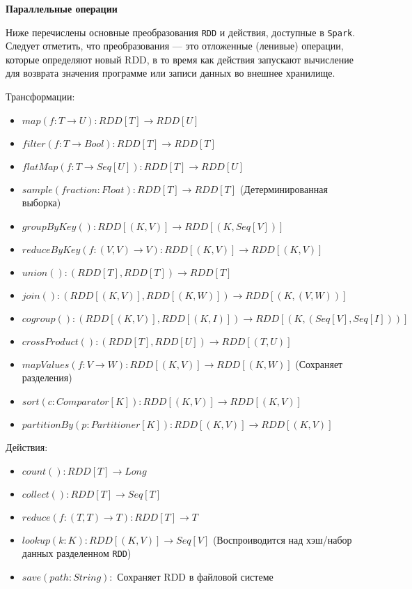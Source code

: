 \textbf{Параллельные операции}

Ниже перечислены основные преобразования \texttt{RDD} и действия, доступные в \texttt{Spark}. 
Следует отметить, что преобразования --- это отложенные (ленивые) операции, которые определяют новый RDD, в то время как действия запускают вычисление для возврата значения программе или записи данных во внешнее хранилище.

Трансформации: 
\begin{itemize}
  \item $map( f : T \rightarrow U) : RDD[T] \rightarrow RDD[U]$  
  \item $filter( f : T \rightarrow Bool) : RDD[T] \rightarrow RDD[T]$ 
  \item $flatMap( f : T \rightarrow Seq[U]) : RDD[T] \rightarrow RDD[U]$
  \item $sample(fraction : Float) : RDD[T] \rightarrow RDD[T]$ (Детерминированная выборка) 
  \item $groupByKey() : RDD[(K, V)] \rightarrow RDD[(K, Seq[V])]$ 
  \item $reduceByKey( f : (V, V) \rightarrow V) : RDD[(K, V)] \rightarrow RDD[(K, V)]$ 
  \item $union() : (RDD[T], RDD[T]) \rightarrow RDD[T]$ 
  \item $join() : (RDD[(K, V)], RDD[(K, W)]) \rightarrow RDD[(K, (V, W))]$ 
  \item $cogroup() : (RDD[(K, V)],RDD[(K, I)]) \rightarrow RDD[(K, (Seq[V],Seq[I]))]$ 
  \item $crossProduct() : (RDD[T], RDD[U]) \rightarrow RDD[(T, U)]$ 
  \item $mapValues( f : V \rightarrow W) : RDD[(K, V)] \rightarrow RDD[(K, W)]$ (Сохраняет разделения) 
  \item $sort(c : Comparator[K]) : RDD[(K, V)] \rightarrow RDD[(K, V)]$ 
  \item $partitionBy(p : Partitioner[K]) : RDD[(K, V)] \rightarrow RDD[(K, V)]$ 
\end{itemize}

Действия:
\begin{itemize}
  \item $count() : RDD[T] \rightarrow Long$
  \item $collect() : RDD[T] \rightarrow Seq[T]$
  \item $reduce( f : (T, T) \rightarrow T) : RDD[T] \rightarrow T$
  \item $lookup(k : K) : RDD[(K, V)] \rightarrow Seq[V]$ (Воспроиводится над хэш/набор данных разделенном \texttt{RDD})
  \item $save(path : String) : $ Сохраняет RDD в файловой системе
\end{itemize}

